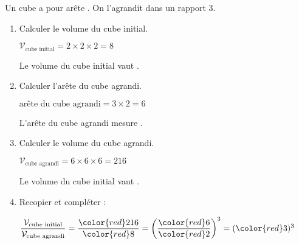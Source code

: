     \phantom{rrr}

    \begin{multicols}{2}
        Un cube a pour arête . On l'agrandit dans un rapport $3$.

        \begin{enumerate}
            \item Calculer le volume du cube initial.

            {\color{red}$\mathcal{V}_{\text{cube initial}}=2\times 2\times 2 = 8$

            Le volume du cube initial vaut .
            }
            \item Calculer l'arête du cube agrandi.

            {\color{red} $\text{arête du cube agrandi} = 3\times 2 = 6$

            L'arête du cube agrandi mesure .
            }
            \columnbreak
            \item Calculer le volume du cube agrandi.

            {\color{red}$\mathcal{V}_{\text{cube agrandi}}=6\times 6\times 6 = 216$

            Le volume du cube initial vaut .
            }
            \item Recopier et compléter :

            \smallskip
            $\dfrac{\mathcal{V}_{\text{cube initial}}}{\mathcal{V}_{\text{cube agrandi}}}=\dfrac{{\color{red}216}}{{\color{red}8}}=\left(\dfrac{{\color{red}6}}{{\color{red}2}}\right)^3=({\color{red}3})^3$
        \end{enumerate}
    \end{multicols}
